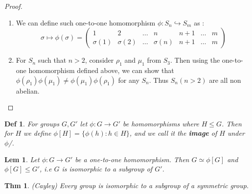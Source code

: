 \documentclass[paper=a4, fontsize=11pt]{scrartcl}
\newcommand{\nextline}{$ $ \newline \vspace{-0.15in}}
\newtheorem{theorem}{Thm}
\newtheorem{definition}{Def}
\newtheorem{lemma}{Lem}
\begin{document}
\begin{proof}
\nextline
\begin{enumerate}
	\item We can define such one-to-one homomorphism $\phi : S_n \hookrightarrow S_m$ as :
	\begin{equation}\nonumber
		\sigma \mapsto \phi(\sigma) =
		\begin{pmatrix}
		1 & 2 & \dots & n & n+1 & \dots & m \\
		\sigma(1) & \sigma(2) & \dots & \sigma(n) & n+1 & \dots & m 
		\end{pmatrix}
	\end{equation} 
	\item For $S_n$ such that $n>2$, consider $\rho_1$ and $\mu_1$ from $S_3$. Then using the one-to-one homomorphism defined above, we can show that $\phi(\rho_1)\phi(\mu_1) \neq \phi(\mu_1)\phi(\rho_1)$ for any $S_n$. Thus $S_n (n>2)$ are all non abelian.\\
\end{enumerate}
\end{proof}

\begin{definition}
	For groups $G,G'$ let $\phi:G \to G'$ be homomorphisms where $H\leqslant G$. Then for $H$ we define $\phi [H]=\{ \phi(h) : h\in H \}$, and we call it the \textbf{image} of $H$ under $\phi$/. \\ 
\end{definition}

\begin{lemma}
	Let $\phi:G\to G'$ be a one-to-one homomorphism. Then $G \simeq \phi[G]$ and $\phi[G] \leqslant G'$, i.e $G$ is isomorphic to a subgroup of $G'$.\\
\end{lemma}

\begin{theorem}(Cayley)
	Every group is isomorphic to a subgroup of a symmetric group. \\
\end{theorem}
\end{document}
